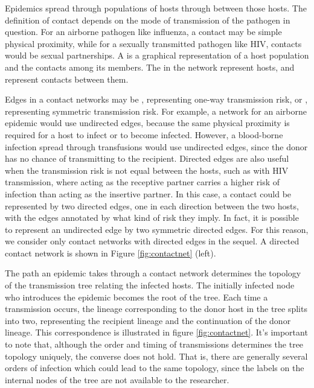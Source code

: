 Epidemics spread through populations of hosts through  between
those hosts. The definition of contact depends on the mode of transmission of
the pathogen in question. For an airborne pathogen like influenza, a contact
may be simple physical proximity, while for a sexually transmitted pathogen
like HIV, contacts would be sexual partnerships. A  is a
graphical representation of a host population and the contacts among its
members. The  in the network represent hosts, and 
represent contacts between them. 

Edges in a contact networks may be , representing one-way
transmission risk, or , representing symmetric transmission
risk. For example, a network for an airborne epidemic would use undirected
edges, because the same physical proximity is required for a host to infect or
to become infected. However, a blood-borne infection spread through
transfusions would use undirected edges, since the donor has no chance of
transmitting to the recipient. Directed edges are also useful when the
transmission risk is not equal between the hosts, such as with HIV
transmission, where acting as the receptive partner carries a higher risk of
infection than acting as the insertive partner. In this case, a contact could
be represented by two directed edges, one in each direction between the two
hosts, with the edges annotated by what kind of risk they imply. In fact, it is
possible to represent an undirected edge by two symmetric directed edges. For
this reason, we consider only contact networks with directed edges in the
sequel. A directed contact network is shown in Figure \ref{fig:contactnet}
(left).

The path an epidemic takes through a contact network determines the topology of
the transmission tree relating the infected hosts. The initially infected node
who introduces the epidemic becomes the root of the tree. Each time a
transmission occurs, the lineage corresponding to the donor host in the tree
splits into two, representing the recipient lineage and the continuation of the
donor lineage. This correspondence is illustrated in figure
\ref{fig:contactnet}. It's important to note that, although the order and
timing of transmissions determines the tree topology uniquely, the converse
does not hold. That is, there are generally several orders of infection which
could lead to the same topology, since the labels on the internal nodes of the
tree are not available to the researcher.

